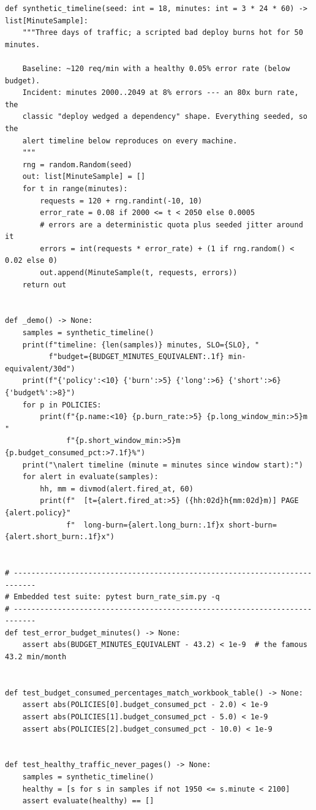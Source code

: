 \begin{verbatim}
def synthetic_timeline(seed: int = 18, minutes: int = 3 * 24 * 60) -> list[MinuteSample]:
    """Three days of traffic; a scripted bad deploy burns hot for 50 minutes.

    Baseline: ~120 req/min with a healthy 0.05% error rate (below budget).
    Incident: minutes 2000..2049 at 8% errors --- an 80x burn rate, the
    classic "deploy wedged a dependency" shape. Everything seeded, so the
    alert timeline below reproduces on every machine.
    """
    rng = random.Random(seed)
    out: list[MinuteSample] = []
    for t in range(minutes):
        requests = 120 + rng.randint(-10, 10)
        error_rate = 0.08 if 2000 <= t < 2050 else 0.0005
        # errors are a deterministic quota plus seeded jitter around it
        errors = int(requests * error_rate) + (1 if rng.random() < 0.02 else 0)
        out.append(MinuteSample(t, requests, errors))
    return out


def _demo() -> None:
    samples = synthetic_timeline()
    print(f"timeline: {len(samples)} minutes, SLO={SLO}, "
          f"budget={BUDGET_MINUTES_EQUIVALENT:.1f} min-equivalent/30d")
    print(f"{'policy':<10} {'burn':>5} {'long':>6} {'short':>6} {'budget%':>8}")
    for p in POLICIES:
        print(f"{p.name:<10} {p.burn_rate:>5} {p.long_window_min:>5}m "
              f"{p.short_window_min:>5}m {p.budget_consumed_pct:>7.1f}%")
    print("\nalert timeline (minute = minutes since window start):")
    for alert in evaluate(samples):
        hh, mm = divmod(alert.fired_at, 60)
        print(f"  [t={alert.fired_at:>5} ({hh:02d}h{mm:02d}m)] PAGE {alert.policy}"
              f"  long-burn={alert.long_burn:.1f}x short-burn={alert.short_burn:.1f}x")


# ---------------------------------------------------------------------------
# Embedded test suite: pytest burn_rate_sim.py -q
# ---------------------------------------------------------------------------
def test_error_budget_minutes() -> None:
    assert abs(BUDGET_MINUTES_EQUIVALENT - 43.2) < 1e-9  # the famous 43.2 min/month


def test_budget_consumed_percentages_match_workbook_table() -> None:
    assert abs(POLICIES[0].budget_consumed_pct - 2.0) < 1e-9
    assert abs(POLICIES[1].budget_consumed_pct - 5.0) < 1e-9
    assert abs(POLICIES[2].budget_consumed_pct - 10.0) < 1e-9


def test_healthy_traffic_never_pages() -> None:
    samples = synthetic_timeline()
    healthy = [s for s in samples if not 1950 <= s.minute < 2100]
    assert evaluate(healthy) == []



\end{verbatim}
